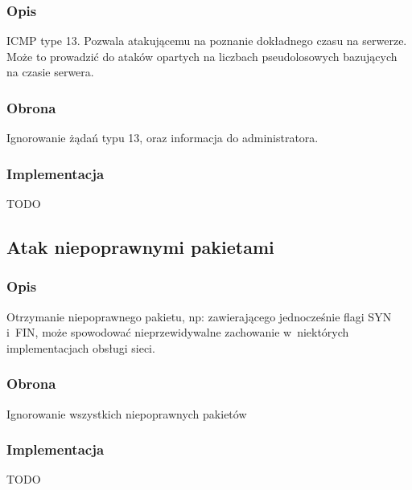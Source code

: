 \documentclass[a4paper,10pt]{article}
\begin{document}
		\subsubsection{Opis}
			ICMP type 13. Pozwala atakującemu na poznanie dokładnego czasu na serwerze. Może to prowadzić do ataków opartych na liczbach pseudolosowych bazujących na czasie serwera.
		\subsubsection{Obrona}
			Ignorowanie żądań typu 13, oraz informacja do administratora.
		\subsubsection{Implementacja}
			TODO
	\subsection{Atak niepoprawnymi pakietami}
		\subsubsection{Opis}
			Otrzymanie niepoprawnego pakietu, np: zawierającego jednocześnie flagi SYN i~FIN, może spowodować nieprzewidywalne zachowanie w~niektórych implementacjach obsługi sieci.
		\subsubsection{Obrona}
			Ignorowanie wszystkich niepoprawnych pakietów
		\subsubsection{Implementacja}
			TODO
\end{document}
